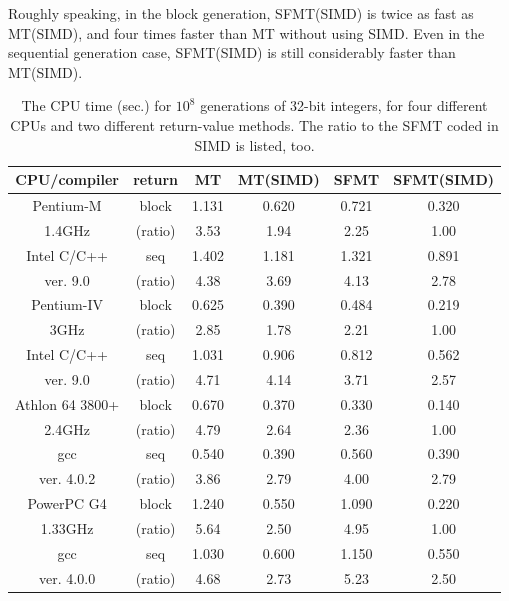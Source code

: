 \documentclass[acmnow]{acmtrans2m}
\begin{document}
Roughly speaking, in the block generation, 
SFMT(SIMD) is twice as fast as MT(SIMD),
and four times faster than MT without using SIMD.
Even in the sequential generation case,
SFMT(SIMD) is still considerably faster than MT(SIMD).

\begin{table}
\begin{center}
\begin{tabular}{|c|c||c|c|c|c|}
\hline
CPU/compiler & return & MT & MT(SIMD) & SFMT & SFMT(SIMD)  \\ \hline \hline
Pentium-M & block & 1.131  & 0.620  & 0.721  & 0.320 \\ \cline{3-6}
1.4GHz & (ratio) & 3.53\phantom{0}  & 1.94\phantom{0}  & 2.25\phantom{0}
  & 1.00\phantom{0} \\ \cline{2-6}
Intel C/C++ & seq & 1.402  & 1.181  & 1.321  & 0.891 \\ \cline{3-6}
ver. 9.0 & (ratio) & 4.38\phantom{0}  & 3.69\phantom{0}  & 4.13\phantom{0}
  & 2.78\phantom{0} \\ \hline
Pentium-IV & block & 0.625  & 0.390  & 0.484  & 0.219 \\ \cline{3-6}
3GHz & (ratio) & 2.85\phantom{0}  & 1.78\phantom{0}  & 2.21\phantom{0}  
& 1.00\phantom{0} \\ \cline{2-6}
Intel C/C++ & seq & 1.031  & 0.906  & 0.812  & 0.562 \\ \cline{3-6}
ver. 9.0 & (ratio) & 4.71\phantom{0}  & 4.14\phantom{0}  & 3.71\phantom{0}
  & 2.57\phantom{0} \\ \hline
Athlon 64 3800+ & block & 0.670  & 0.370  & 0.330  & 0.140 \\ \cline{3-6}
2.4GHz & (ratio) & 4.79\phantom{0}  & 2.64\phantom{0}  & 2.36\phantom{0}
  & 1.00\phantom{0} \\ \cline{2-6}
gcc & seq & 0.540  & 0.390  & 0.560  & 0.390 \\ \cline{3-6}
ver. 4.0.2 & (ratio) & 3.86\phantom{0}  & 2.79\phantom{0}  & 4.00\phantom{0}
  & 2.79\phantom{0} \\ \hline
PowerPC G4 & block & 1.240  & 0.550  & 1.090  & 0.220 \\ \cline{3-6}
1.33GHz & (ratio) & 5.64\phantom{0}  & 2.50\phantom{0}  & 4.95\phantom{0}
  & 1.00\phantom{0} \\ \cline{2-6}
gcc & seq & 1.030  & 0.600  & 1.150  & 0.550 \\ \cline{3-6}
ver. 4.0.0 & (ratio) & 4.68\phantom{0}  & 2.73\phantom{0}  & 5.23\phantom{0}
  & 2.50\phantom{0} \\ \hline
\end{tabular}
\end{center}
\caption{The CPU time (sec.) for $10^8$ generations of 32-bit integers,
for four different CPUs and two different return-value methods. 
The ratio to the SFMT coded in SIMD is listed, too.}\label{tab:speed}
\end{table}
\end{document}
